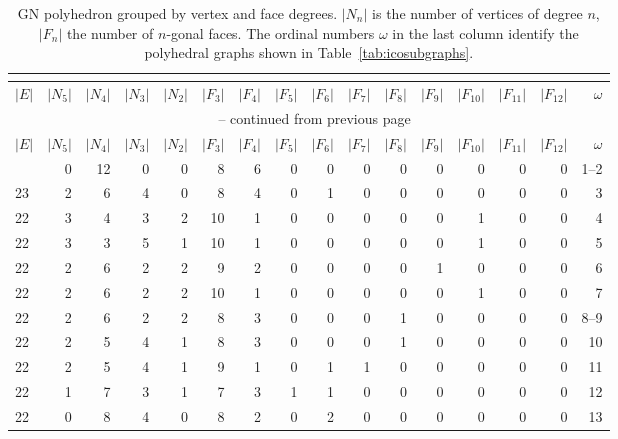 \footnotesize{\begin{longtable}{l@{\hskip 4pt}r@{\hskip 4pt}r@{\hskip 4pt}r@{\hskip 4pt}r@{\hskip 4pt}r@{\hskip 4pt}r@{\hskip 4pt}r@{\hskip 4pt}r@{\hskip 4pt}r@{\hskip 4pt}r@{\hskip 4pt}r@{\hskip 4pt}r@{\hskip 4pt}r@{\hskip 4pt}r@{\hskip 8pt}r}
    \caption{GN polyhedron grouped by vertex and face degrees. $|N_n|$ is the
    number of vertices of degree $n$, $|F_n|$ the number of $n$-gonal faces.
    The ordinal numbers $\omega$ in the last column identify the polyhedral
    graphs shown in Table~\ref{tab:icosubgraphs}.}\\
    \label{tab:verticesandfaces}\\
\toprule    
    $|E|$ & $|N_5|$ & $|N_4|$ & $|N_3|$ & $|N_2|$ & $|F_3|$ & $|F_4|$ & $|F_5|$ & $|F_6|$ & $|F_7|$ & $|F_8|$ & $|F_9|$ & $|F_{10}|$ & $|F_{11}|$ & $|F_{12}|$ & $\omega$ \\\midrule
\endfirsthead
\multicolumn{16}{c}{\tablename~\thetable{} -- continued from previous page}\\
\toprule
    $|E|$ & $|N_5|$ & $|N_4|$ & $|N_3|$ & $|N_2|$ & $|F_3|$ & $|F_4|$ & $|F_5|$ & $|F_6|$ & $|F_7|$ & $|F_8|$ & $|F_9|$ & $|F_{10}|$ & $|F_{11}|$ & $|F_{12}|$ & $\omega$ \\\midrule
\endhead
\bottomrule\endfoot
    24 & 0  & 12 & 0  & 0  & 8  & 6  & 0  & 0  & 0  & 0  & 0  & 0  & 0  & 0  & 1--2\\
    23 & 2  & 6  & 4  & 0  & 8  & 4  & 0  & 1  & 0  & 0  & 0  & 0  & 0  & 0  & 3  \\
    22 & 3  & 4  & 3  & 2  & 10 & 1  & 0  & 0  & 0  & 0  & 0  & 1  & 0  & 0  & 4  \\
    22 & 3  & 3  & 5  & 1  & 10 & 1  & 0  & 0  & 0  & 0  & 0  & 1  & 0  & 0  & 5  \\
    22 & 2  & 6  & 2  & 2  & 9  & 2  & 0  & 0  & 0  & 0  & 1  & 0  & 0  & 0  & 6  \\
    22 & 2  & 6  & 2  & 2  & 10 & 1  & 0  & 0  & 0  & 0  & 0  & 1  & 0  & 0  & 7  \\
    22 & 2  & 6  & 2  & 2  & 8  & 3  & 0  & 0  & 0  & 1  & 0  & 0  & 0  & 0  & 8--9\\
    22 & 2  & 5  & 4  & 1  & 8  & 3  & 0  & 0  & 0  & 1  & 0  & 0  & 0  & 0  & 10 \\
    22 & 2  & 5  & 4  & 1  & 9  & 1  & 0  & 1  & 1  & 0  & 0  & 0  & 0  & 0  & 11\\
    22 & 1  & 7  & 3  & 1  & 7  & 3  & 1  & 1  & 0  & 0  & 0  & 0  & 0  & 0  & 12 \\
    22 & 0  & 8  & 4  & 0  & 8  & 2  & 0  & 2  & 0  & 0  & 0  & 0  & 0  & 0  & 13\\

\end{longtable}}
